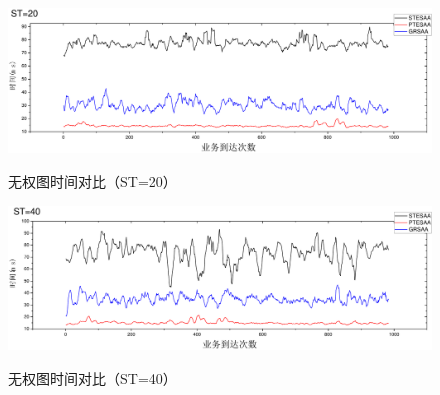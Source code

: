 \begin{figure}
\vspace{-0.5cm}
\setlength{\abovecaptionskip}{-0.5cm}
\begin{center}
{\includegraphics[width=1 \textwidth]{figures/B20T.pdf}}
\end{center}
\caption{{\footnotesize{无权图时间对比（ST=20）}}}
\label{B20T}
\end{figure}
\begin{figure}
\vspace{-0.5cm}
\setlength{\abovecaptionskip}{-0.5cm}
\begin{center}
{\includegraphics[width=1 \textwidth]{figures/B40T.pdf}}
\end{center}
\caption{{\footnotesize{无权图时间对比（ST=40）}}}
\label{B40T}
\end{figure}

